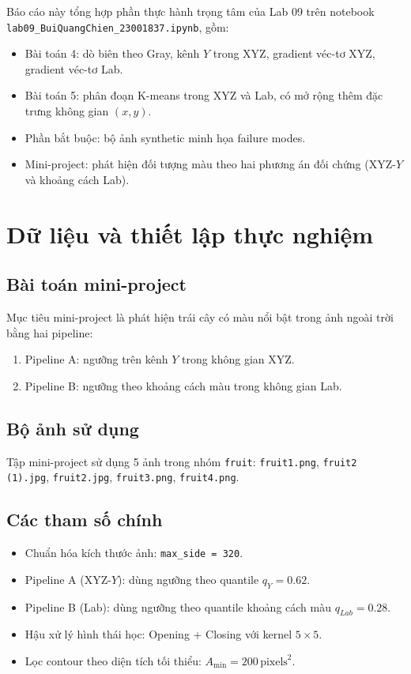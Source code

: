 \documentclass[12pt,a4paper]{article}
\begin{document}
Báo cáo này tổng hợp phần thực hành trọng tâm của Lab 09 trên notebook
\texttt{lab09\_BuiQuangChien\_23001837.ipynb}, gồm:
\begin{itemize}
    \item Bài toán 4: dò biên theo Gray, kênh $Y$ trong XYZ, gradient véc-tơ XYZ, gradient véc-tơ Lab.
    \item Bài toán 5: phân đoạn K-means trong XYZ và Lab, có mở rộng thêm đặc trưng không gian $(x, y)$.
    \item Phần bắt buộc: bộ ảnh synthetic minh họa failure modes.
    \item Mini-project: phát hiện đối tượng màu theo hai phương án đối chứng (XYZ-$Y$ và khoảng cách Lab).
\end{itemize}

\section{Dữ liệu và thiết lập thực nghiệm}

\subsection{Bài toán mini-project}
Mục tiêu mini-project là phát hiện trái cây có màu nổi bật trong ảnh ngoài trời bằng hai pipeline:
\begin{enumerate}
    \item Pipeline A: ngưỡng trên kênh $Y$ trong không gian XYZ.
    \item Pipeline B: ngưỡng theo khoảng cách màu trong không gian Lab.
\end{enumerate}

\subsection{Bộ ảnh sử dụng}
Tập mini-project sử dụng 5 ảnh trong nhóm \texttt{fruit}:
\texttt{fruit1.png}, \texttt{fruit2 (1).jpg}, \texttt{fruit2.jpg}, \texttt{fruit3.png}, \texttt{fruit4.png}.

\subsection{Các tham số chính}
\begin{itemize}
    \item Chuẩn hóa kích thước ảnh: \texttt{max\_side = 320}.
    \item Pipeline A (XYZ-$Y$): dùng ngưỡng theo quantile $q_Y = 0.62$.
    \item Pipeline B (Lab): dùng ngưỡng theo quantile khoảng cách màu $q_{Lab} = 0.28$.
    \item Hậu xử lý hình thái học: Opening + Closing với kernel $5\times5$.
    \item Lọc contour theo diện tích tối thiểu: $A_{\min}=200\,\text{pixels}^2$.
\end{itemize}
\end{document}
